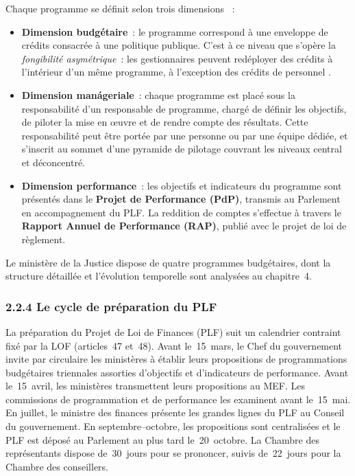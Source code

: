 Chaque programme se d\'efinit selon trois dimensions \citep{MEF2015b}~:

\begin{itemize}
    \item \textbf{Dimension budg\'etaire}~: le programme correspond \`a une enveloppe de cr\'edits consacr\'ee \`a une politique publique. C'est \`a ce niveau que s'op\`ere la \textit{fongibilit\'e asym\'etrique}~: les gestionnaires peuvent red\'eployer des cr\'edits \`a l'int\'erieur d'un m\^eme programme, \`a l'exception des cr\'edits de personnel \citep{MEF2015b}.

    \item \textbf{Dimension man\'ageriale}~: chaque programme est plac\'e sous la responsabilit\'e d'un responsable de programme, charg\'e de d\'efinir les objectifs, de piloter la mise en \oe{}uvre et de rendre compte des r\'esultats. Cette responsabilit\'e peut \^etre port\'ee par une personne ou par une \'equipe d\'edi\'ee, et s'inscrit au sommet d'une pyramide de pilotage couvrant les niveaux central et d\'econcentr\'e.

    \item \textbf{Dimension performance}~: les objectifs et indicateurs du programme sont pr\'esent\'es dans le \textbf{Projet de Performance (PdP)}, transmis au Parlement en accompagnement du PLF. La reddition de comptes s'effectue \`a travers le \textbf{Rapport Annuel de Performance (RAP)}, publi\'e avec le projet de loi de r\`eglement.
\end{itemize}

Le minist\`ere de la Justice dispose de quatre programmes budg\'etaires, dont la structure d\'etaill\'ee et l'\'evolution temporelle sont analys\'ees au chapitre~4.

\subsubsection*{2.2.4 \quad Le cycle de pr\'eparation du PLF}

La pr\'eparation du Projet de Loi de Finances (PLF) suit un calendrier contraint fix\'e par la LOF (articles~47 et~48). Avant le~15~mars, le Chef du gouvernement invite par circulaire les minist\`eres \`a \'etablir leurs propositions de programmations budg\'etaires triennales assorties d'objectifs et d'indicateurs de performance. Avant le~15~avril, les minist\`eres transmettent leurs propositions au MEF. Les commissions de programmation et de performance les examinent avant le~15~mai. En juillet, le ministre des finances pr\'esente les grandes lignes du PLF au Conseil du gouvernement. En septembre--octobre, les propositions sont centralis\'ees et le PLF est d\'epos\'e au Parlement au plus tard le~20~octobre. La Chambre des repr\'esentants dispose de~30~jours pour se prononcer, suivis de~22~jours pour la Chambre des conseillers.

